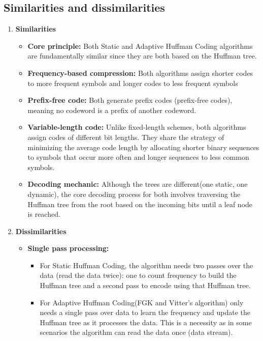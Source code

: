 \subsection{Similarities and dissimilarities}
\begin{enumerate}[label=\textbf{\Alph*.}]
    \item \textbf{Similarities}
    \begin{itemize}
        \item \textbf{Core principle:} Both Static and Adaptive Huffman Coding algorithms are fundamentally similar since they are both based on the Huffman tree.
        \item \textbf{Frequency-based compression:} Both algorithms assign shorter codes to more frequent symbols and longer codes to less frequent symbols
        \item \textbf{Prefix-free code:} Both generate prefix codes (prefix-free codes), meaning no codeword is a prefix of another codeword.
        \item \textbf{Variable-length code:} Unlike fixed-length schemes, both algorithms assign codes of different bit lengths. They share the strategy of minimizing the average code length by allocating shorter binary sequences to symbols that occur more often and longer sequences to less common symbols. 
        \item \textbf{Decoding mechanic:} Although the trees are different(one static, one dynamic), the core decoding process for both involves traversing the Huffman tree from the root based on the incoming bits until a leaf node is reached.
    \end{itemize}
    \item \textbf{Dissimilarities}
    \begin{itemize}
        \item \textbf{Single pass processing:}
        \begin{itemize}
            \item For Static Huffman Coding, the algorithm needs two passes over the data (read the data twice): one to count frequency to build the Huffman tree and a second pass to encode using that Huffman tree.
            \item For Adaptive Huffman Coding(FGK and Vitter’s algorithm) only needs a single pass over data to learn the frequency and update the Huffman tree as it processes the data. This is a necessity as in some scenarios the algorithm can read the data once (data stream).
        \end{itemize}

\end{itemize}
\end{enumerate}
